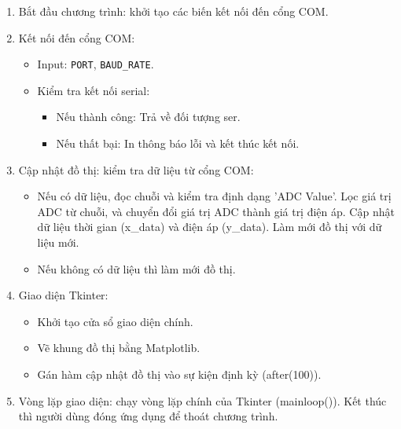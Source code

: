 \begin{enumerate}[label = Bước \arabic *:]
	\item Bắt đầu chương trình: khởi tạo các biến kết nối đến cổng COM.
	\item Kết nối đến cổng COM:
		\begin{itemize}[label=-]
			\item Input: \texttt{PORT}, \texttt{BAUD\_RATE}.
			\item Kiểm tra kết nối serial: 
				\begin{itemize}[label = +]
					\item Nếu thành công: Trả về đối tượng ser.
					\item Nếu thất bại: In thông báo lỗi và kết thúc kết nối.
				\end{itemize}
		\end{itemize}
	\item Cập nhật đồ thị: kiểm tra dữ liệu từ cổng COM:
		\begin{itemize}[label = -]
			\item Nếu có dữ liệu, đọc chuỗi và kiểm tra định dạng 'ADC Value'. Lọc giá trị ADC từ chuỗi, và chuyển đổi giá trị ADC thành giá trị điện áp. Cập nhật dữ liệu thời gian (x\_data) và điện áp (y\_data). Làm mới đồ thị với dữ liệu mới.
			\item Nếu không có dữ liệu thì làm mới đồ thị.
		\end{itemize}
	\item Giao diện Tkinter:
		\begin{itemize}[label=-]
			\item Khởi tạo cửa sổ giao diện chính.
			\item Vẽ khung đồ thị bằng Matplotlib.
			\item Gán hàm cập nhật đồ thị vào sự kiện định kỳ (after(100)).
		\end{itemize}
	\item Vòng lặp giao diện: chạy vòng lặp chính của Tkinter (mainloop()). Kết thúc thì người dùng đóng ứng dụng để thoát chương trình.
\end{enumerate}